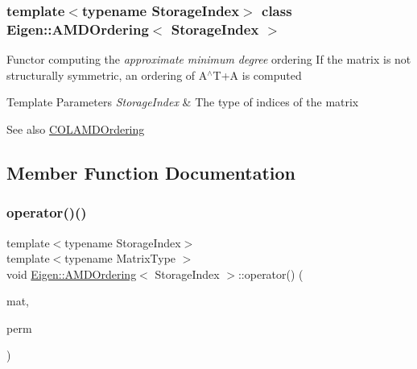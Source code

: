 \subsubsection*{template$<$typename Storage\+Index$>$\newline
class Eigen\+::\+A\+M\+D\+Ordering$<$ Storage\+Index $>$}

Functor computing the {\itshape approximate} {\itshape minimum} {\itshape degree} ordering If the matrix is not structurally symmetric, an ordering of A$^\wedge$\+T+A is computed 
\begin{DoxyTemplParams}{Template Parameters}
{\em Storage\+Index} & The type of indices of the matrix \\
\hline
\end{DoxyTemplParams}
\begin{DoxySeeAlso}{See also}
\mbox{\hyperlink{class_eigen_1_1_c_o_l_a_m_d_ordering}{C\+O\+L\+A\+M\+D\+Ordering}} 
\end{DoxySeeAlso}


\subsection{Member Function Documentation}
\mbox{\label{class_eigen_1_1_a_m_d_ordering_afce433557abcba9e49fa81581a58fa51}} 
\subsubsection{\texorpdfstring{operator()()}{operator()()}\hspace{0.1cm}{\footnotesize\ttfamily [1/2]}}
{\footnotesize\ttfamily template$<$typename Storage\+Index$>$ \\
template$<$typename Matrix\+Type $>$ \\
void \mbox{\hyperlink{class_eigen_1_1_a_m_d_ordering}{Eigen\+::\+A\+M\+D\+Ordering}}$<$ Storage\+Index $>$\+::operator() (\begin{DoxyParamCaption}\item[{const Matrix\+Type \&}]{mat,  }\item[{\mbox{\hyperlink{class_eigen_1_1_permutation_matrix}{Permutation\+Type}} \&}]{perm }\end{DoxyParamCaption})\hspace{0.3cm}{\ttfamily [inline]}}

